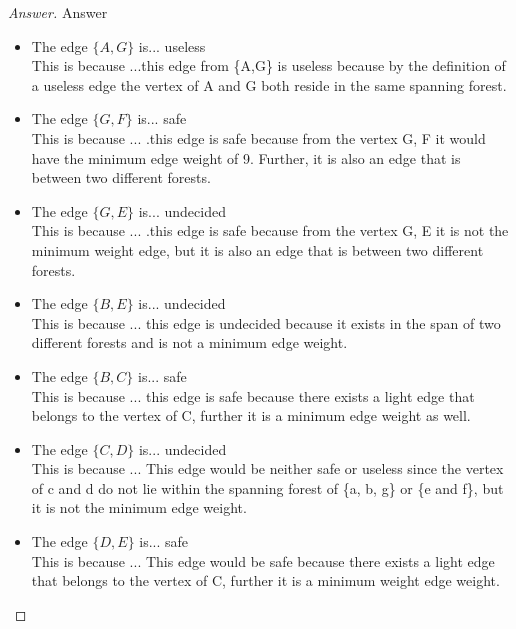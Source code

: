 \documentclass[11pt]{article}
\theoremstyle{definition}
\theoremstyle{definition}
\theoremstyle{definition}
\begin{document}
\begin{proof}[Answer] Answer\\
\begin{itemize} 
\item The edge $\{A,G\}$ is... useless \\%
This is because ...this edge from \{A,G\} is useless because by the definition of a useless edge the vertex of A and G both reside in the same spanning forest.
\item The edge $\{G,F\}$ is... safe\\%
This is because ... .this edge is safe because from the vertex {G, F} it would have the minimum edge weight of 9. Further, it is also an edge that is between two different forests. %
\item The edge $\{G,E\}$ is... undecided\\%
This is because ... .this edge is safe because from the vertex {G, E} it is not the minimum weight edge, but it is also an edge that is between two different forests.
\item The edge $\{B,E\}$ is... undecided\\%
This is because ... this edge is undecided because it exists in the span of two different forests and  is not a minimum edge weight.%
\item The edge $\{B,C\}$ is... safe \\%
This is because ... this edge is safe because there exists a light edge that belongs to the vertex of C, further it is a minimum edge weight as well.%
\item The edge $\{C,D\}$ is... undecided \\%
This is because ... This edge would be neither safe or useless since the vertex of c and d do not lie within the spanning forest of \{a, b, g\} or \{e and f\}, but it is not the minimum edge weight.
\item The edge $\{D,E\}$ is... safe\\%
This is because ... This edge would be safe because there exists a light edge that belongs to the vertex of C, further it is a minimum weight edge weight. %
\end{itemize}
\end{proof}


\newpage
\end{document}

